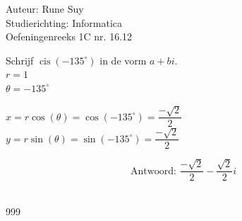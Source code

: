 \documentclass[a4paper]{article}
\newcommand{\degree}{^{\circ}}
\begin{document}
  
\noindent \large Auteur: Rune Suy \\
\noindent \large Studierichting: Informatica\\
\noindent \large Oefeningenreeks 1C nr. 16.12  \\

\medskip

\normalsize

Schrijf $ \operatorname{cis}(-135\degree) $ in de vorm $ a + bi $.\\

$ r=1 $\\

$ \theta = -135\degree $\\

\medskip

$ x = r\cos(\theta) = \cos(-135 \degree) = \dfrac{-\sqrt{2}}{2}$\\

$ y = r\sin(\theta) = \sin(-135 \degree) = \dfrac{-\sqrt{2}}{2}$\\

\medskip

$$ \text{Antwoord: } \dfrac{-\sqrt{2}}{2} - \dfrac{\sqrt{2}}{2}i $$\\

\begin{thebibliography}{999}
\end{thebibliography}
\end{document}
